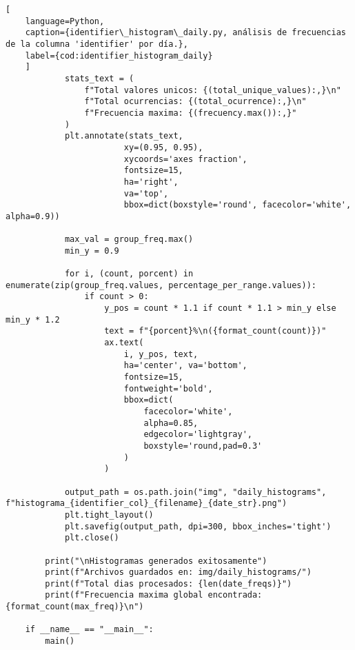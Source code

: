 \begin{lstlisting}[
    language=Python,
    caption={identifier\_histogram\_daily.py, análisis de frecuencias de la columna 'identifier' por día.},
    label={cod:identifier_histogram_daily}
    ]
            stats_text = (
                f"Total valores unicos: {(total_unique_values):,}\n"
                f"Total ocurrencias: {(total_ocurrence):,}\n"
                f"Frecuencia maxima: {(frecuency.max()):,}"
            )
            plt.annotate(stats_text, 
                        xy=(0.95, 0.95), 
                        xycoords='axes fraction', 
                        fontsize=15,
                        ha='right', 
                        va='top',
                        bbox=dict(boxstyle='round', facecolor='white', alpha=0.9))
            
            max_val = group_freq.max()
            min_y = 0.9  
            
            for i, (count, porcent) in enumerate(zip(group_freq.values, percentage_per_range.values)):
                if count > 0:
                    y_pos = count * 1.1 if count * 1.1 > min_y else min_y * 1.2
                    text = f"{porcent}%\n({format_count(count)})"
                    ax.text(
                        i, y_pos, text, 
                        ha='center', va='bottom', 
                        fontsize=15, 
                        fontweight='bold',
                        bbox=dict(
                            facecolor='white', 
                            alpha=0.85, 
                            edgecolor='lightgray', 
                            boxstyle='round,pad=0.3'
                        )
                    )

            output_path = os.path.join("img", "daily_histograms", f"histograma_{identifier_col}_{filename}_{date_str}.png")
            plt.tight_layout()
            plt.savefig(output_path, dpi=300, bbox_inches='tight')
            plt.close()
        
        print("\nHistogramas generados exitosamente")
        print(f"Archivos guardados en: img/daily_histograms/")
        print(f"Total dias procesados: {len(date_freqs)}")
        print(f"Frecuencia maxima global encontrada: {format_count(max_freq)}\n")

    if __name__ == "__main__":
        main()
    
\end{lstlisting}